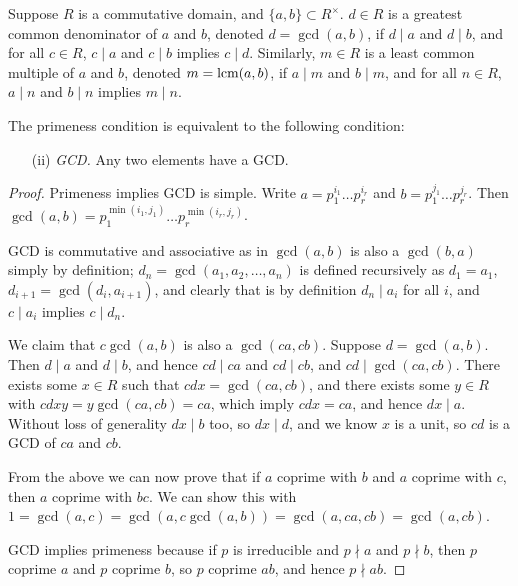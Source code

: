 \begin{definition}
    Suppose \(R\) is a commutative domain, and \(\{a,b\} \subset R^\times\).
    \(d \in R\) is a greatest common denominator of \(a\) and \(b\),
    denoted \(d = \gcd(a,b)\),
    if \(d \mid a\) and \(d \mid b\),
    and for all \(c \in R\), \(c \mid a\) and \(c \mid b\) implies \(c \mid d\).
    Similarly, \(m \in R\) is a least common multiple of \(a\) and \(b\),
    denoted \(m = \operatorname{lcm}(a,b)\),
    if \(a \mid m\) and \(b \mid m\),
    and for all \(n \in R\), \(a \mid n\) and \(b \mid n\) implies \(m \mid n\).
\end{definition}
\begin{theorem}
    The primeness condition is equivalent to the following condition:
    \begin{enumerate}[itemsep=0mm]
        \item[(ii)] \textit{GCD.}
        Any two elements have a GCD.\@
    \end{enumerate}
\end{theorem}
\begin{proof}
    Primeness implies GCD is simple.
    Write \(a = p_1^{i_1} \hdots p_r^{i_r}\)
    and \(b = p_1^{j_1} \hdots p_r^{j_r}\).
    Then \(\gcd(a,b) = p_1^{\min(i_1,j_1)} \hdots p_r^{\min(i_r,j_r)}\).

    \medskip

    GCD is commutative and associative
    as in \(\gcd(a,b)\) is also a \(\gcd(b,a)\) simply by definition;
    \(d_n = \gcd(a_1,a_2,\hdots,a_n)\) is defined recursively as
    \(d_1 = a_1\), \(d_{i+1} = \gcd(d_i,a_{i+1})\),
    and clearly that is by definition \(d_n \mid a_i\) for all \(i\),
    and \(c \mid a_i\) implies \(c \mid d_n\).

    We claim that \(c\gcd(a,b)\) is also a \(\gcd(ca,cb)\).
    Suppose \(d = \gcd(a,b)\).
    Then \(d \mid a\) and \(d \mid b\),
    and hence \(cd \mid ca\) and \(cd \mid cb\),
    and \(cd \mid \gcd(ca,cb)\).
    There exists some \(x \in R\) such that \(cdx = \gcd(ca,cb)\),
    and there exists some \(y \in R\) with \(cdxy = y\gcd(ca,cb) = ca\),
    which imply \(cdx = ca\), and hence \(dx \mid a\).
    Without loss of generality \(dx \mid b\) too, so \(dx \mid d\),
    and we know \(x\) is a unit, so \(cd\) is a GCD of \(ca\) and \(cb\).

    From the above we can now prove that if \(a\) coprime with \(b\)
    and \(a\) coprime with \(c\),
    then \(a\) coprime with \(bc\).
    We can show this with \(1 = \gcd(a,c) = \gcd(a,c\gcd(a,b))
    = \gcd(a,ca,cb) = \gcd(a,cb)\).

    GCD implies primeness because if \(p\) is irreducible
    and \(p \nmid a\) and \(p \nmid b\),
    then \(p\) coprime \(a\) and \(p\) coprime \(b\),
    so \(p\) coprime \(ab\),
    and hence \(p \nmid ab\).
\end{proof}

